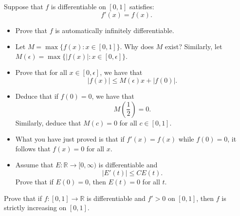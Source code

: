   \begin{exercise}
    Suppose that $f$ is differentiable on $[0, 1]$ satisfies:
    \begin{equation}
      f'(x) = f(x).
    \end{equation}
    
    \begin{itemize}
      \item Prove that $f$ is automatically infinitely differentiable.
      
      \item Let $M = \max\{f(x) : x \in [0, 1]\}$. Why does $M$ exist? Similarly, let $M(\epsilon) = \max\{|f(x)| : x \in [0, \epsilon]\}$.
      
      \item Prove that for all $x \in [0, \epsilon]$, we have that
      \begin{equation}
        |f(x)| \leq M(\epsilon)x + |f(0)|.
      \end{equation}
      
      \item Deduce that if $f(0) = 0$, we have that
      \begin{equation}
        M\left(\frac{1}{2}\right) = 0.
      \end{equation}
      Similarly, deduce that $M(c) = 0$ for all $c \in [0, 1]$.
      
      \item What you have just proved is that if $f'(x) = f(x)$ while $f(0) = 0$, it follows that $f(x) = 0$ for all $x$.
      
      \item Assume that $E : \mathbb{R} \to [0, \infty)$ is differentiable and
      \begin{equation}
        |E'(t)| \leq CE(t).
      \end{equation}
      Prove that if $E(0) = 0$, then $E(t) = 0$ for all $t$.
    \end{itemize}
  \end{exercise}
  \begin{solution}

  \end{solution}

  \begin{exercise}
    Prove that if $f : [0, 1] \to \mathbb{R}$ is differentiable and $f' > 0$ on $[0, 1]$, then $f$ is strictly increasing on $[0, 1]$.
  \end{exercise}
  \begin{solution}

  \end{solution}

